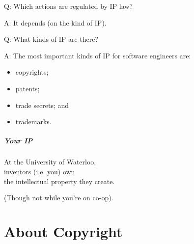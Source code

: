 \begin{frame}
\Large
\begin{changemargin}{1.5cm}
\noindent
Q: Which actions are regulated by IP law?

\noindent
A: It depends (on the kind of IP).
\end{changemargin}
\end{frame}

\begin{frame}
\Large
\begin{changemargin}{1.5cm}
\noindent
Q: What kinds of IP are there?

A: The most important kinds of IP for software engineers are:
\vspace*{-2em}
\begin{itemize}
\item copyrights;
\item patents;
\item trade secrets; and
\item trademarks.
\end{itemize}
\end{changemargin}
\end{frame}

\begin{frame}
\frametitle{Your IP}
\Large
\begin{changemargin}{1.5cm}
\vspace*{-2em}
\noindent
At the University of Waterloo, \\
inventors (i.e. you) own\\
the intellectual property they create.

(Though not while you're on co-op).
\end{changemargin}
\end{frame}

\part{About Copyright}
\begin{frame}
\partpage
\vspace*{-12em}\begin{center}\Huge \textcopyright\end{center}
\end{frame}


